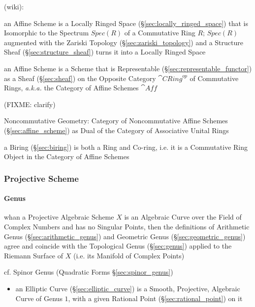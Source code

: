 (wiki):

an Affine Scheme is a Locally Ringed Space (\S\ref{sec:locally_ringed_space})
that is Isomorphic to the Spectrum $Spec(R)$ of a Commutative Ring $R$;
$Spec(R)$ augmented with the Zariski Topology (\S\ref{sec:zariski_topology}) and
a Structure Sheaf (\S\ref{sec:structure_sheaf}) turns it into a Locally Ringed
Space

an Affine Scheme is a Scheme that is Representable
(\S\ref{sec:representable_functor}) as a Sheaf (\S\ref{sec:sheaf}) on the
Opposite Category $\cat{CRing}^{op}$ of Commutative Rings, \emph{a.k.a.} the
Category of Affine Schemes $\cat{Aff}$

(FIXME: clarify)

Noncommutative Geometry: Category of Noncommutative Affine Schemes
(\S\ref{sec:affine_scheme}) as Dual of the Category of Associative Unital Rings

a Biring (\S\ref{sec:biring}) is both a Ring and Co-ring, i.e. it is a
Commutative Ring Object in the Category of Affine Schemes



\subsubsection{Projective Scheme}\label{sec:projective_scheme}

\paragraph{Genus}\label{sec:scheme_genus}\hfill

whan a Projective Algebraic Scheme $X$ is an Algebraic Curve over the Field of
Complex Numbers and has no Singular Points, then the definitions of Arithmetic
Genus (\S\ref{sec:arithmetic_genus}) and Geometric Genus
(\S\ref{sec:geometric_genus}) agree and coincide with the Topological
Genus (\S\ref{sec:genus}) applied to the Riemann Surface of $X$ (i.e. its
Manifold of Complex Points)

\fist cf. Spinor Genus (Quadratic Forms \S\ref{sec:spinor_genus})

\begin{itemize}
  \item an Elliptic Curve (\S\ref{sec:elliptic_curve}) is a Smooth, Projective,
    Algebraic Curve of Genus $1$, with a given Rational Point
    (\S\ref{sec:rational_point}) on it
\end{itemize}



